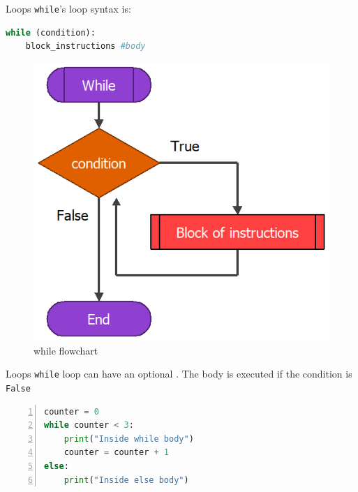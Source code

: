 \begin{frame}[fragile]{Loops}
    \texttt{while}'s loop syntax is:



\begin{lstlisting}[showstringspaces=false,language=python, caption={while syntax}]
while (condition):
    block_instructions #body
\end{lstlisting}            
\begin{figure}
        \includegraphics[scale=.24]{img/While_Chart.png}
\caption{while flowchart}
    \end{figure}
\end{frame}
\begin{frame}[fragile]{Loops}
    \texttt{while} loop can have an optional . The  body is executed if the condition is \texttt{False} 
\begin{lstlisting}[numbers=left,showstringspaces=false,language=python]
counter = 0
while counter < 3:
    print("Inside while body")
    counter = counter + 1
else:
    print("Inside else body")
\end{lstlisting}        
\end{frame}
